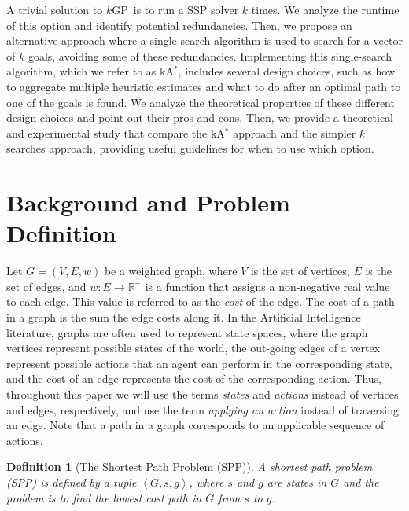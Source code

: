 \documentclass{aicom2e}
\newtheorem{definition}{Definition}
\newcommand{\kgs}{$k$GP}
\newcommand{\kastar}{kA$^*$}
\newcommand{\tuple}[1]{\ensuremath{\left \langle #1 \right \rangle }}
\newcommand{\roni}[1]{\textbf{[RS:#1]}}
\begin{document}
A trivial solution to \kgs\ is to run a SSP solver $k$ times. We analyze the runtime of this option and identify potential redundancies. Then, we propose an alternative approach where a single search algorithm is used to search for a vector of $k$ goals, avoiding some of these redundancies. Implementing this single-search algorithm, which we refer to as \kastar{}, includes several design choices, such as how to aggregate multiple heuristic estimates and what to do after an optimal path to one of the goals is found. We analyze the theoretical properties of these different design choices and point out their pros and cons. Then, we provide a theoretical and experimental study that compare the \kastar{} 
approach and the simpler $k$ searches approach, providing useful guidelines  for when to use which option. 


\section{Background and Problem Definition}



Let $G=(V,E,w)$ be a weighted graph, where $V$ is the set of vertices, $E$ is the set of edges, and $w:E\rightarrow \mathbb{R}^+$ is a function that assigns a non-negative real value to each edge. This value is referred to as the {\em cost} of the edge. The cost of a path in a graph is the sum the edge costs along it. 
In the Artificial Intelligence literature, graphs are often used to represent state spaces, 
where the graph vertices represent possible states of the world, the out-going edges of a vertex represent possible actions that an agent can perform in the corresponding state, and the cost of an edge represents the cost of the corresponding action. 
Thus, throughout this paper we will use the terms {\em states} and {\em actions} instead of vertices and edges, respectively, and use the term {\em applying an action} instead of traversing an edge. Note that a path in a graph corresponds to an applicable sequence of actions.

\begin{definition}[The Shortest Path Problem (SPP)]
A shortest path problem (SPP) is defined by a tuple $\tuple{G,s,g}$, where $s$
and $g$ are states in $G$ and the problem is to find the lowest cost path in
$G$ from $s$ to $g$. \label{def:spp}
\end{definition}
\end{document}

